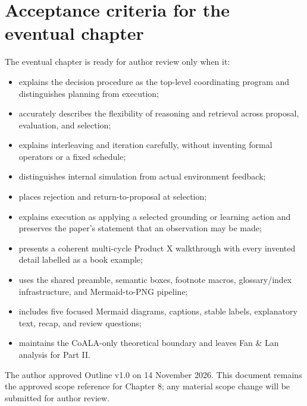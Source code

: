 \section*{Acceptance criteria for the eventual chapter}
The eventual chapter is ready for author review only when it:
\begin{itemize}
  \item explains the decision procedure as the top-level coordinating program and distinguishes planning from execution;
  \item accurately describes the flexibility of reasoning and retrieval across proposal, evaluation, and selection;
  \item explains interleaving and iteration carefully, without inventing formal operators or a fixed schedule;
  \item distinguishes internal simulation from actual environment feedback;
  \item places rejection and return-to-proposal at selection;
  \item explains execution as applying a selected grounding or learning action and preserves the paper's statement that an observation may be made;
  \item presents a coherent multi-cycle Product X walkthrough with every invented detail labelled as a book example;
  \item uses the shared preamble, semantic boxes, footnote macros, glossary/index infrastructure, and Mermaid-to-PNG pipeline;
  \item includes five focused Mermaid diagrams, captions, stable labels, explanatory text, recap, and review questions;
  \item maintains the CoALA-only theoretical boundary and leaves Fan \& Lan analysis for Part II.
\end{itemize}
\begin{takeawaybox}
The author approved Outline v1.0 on 14 November 2026. This document remains the approved scope reference for Chapter 8; any material scope change will be submitted for author review.
\end{takeawaybox}

